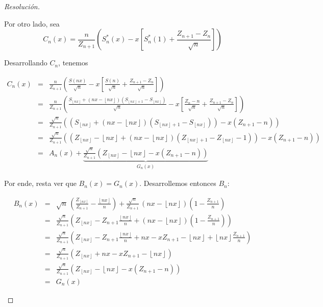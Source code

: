 \documentclass[a4paper,11pt]{article}
\newcommand{\Sst}[1]{S_n^{*}(#1)}
\newcommand{\floor}[1]{\left\lfloor #1 \right\rfloor}
\newcommand{\fnx}{\floor{nx}}
\begin{document}
\begin{proof}[Resoluci\'on]
\begin{enumerate}
    Por otro lado, sea
    $$C_n(x) = \frac{n}{Z_{n+1}} \left(\Sst{x} - x \left[ \Sst{1} + \frac{Z_{n+1} - Z_n}{\sqrt{n}} \right] \right)$$

    Desarrollando $C_n$, tenemos

    \begin{eqnarray*}
        C_n(x) &=& \frac{n}{Z_{n+1}} \left(\frac{S(nx)}{\sqrt{n}} - x \left[ \frac{S(n)}{\sqrt{n}} + \frac{Z_{n+1} - Z_n}{\sqrt{n}} \right] \right) \\
            &=& \frac{n}{Z_{n+1}} \left(\frac{S_{\floor{nx}} + (nx - \floor{nx}) (S_{\floor{nx}+1} - S_{\floor{nx}})}{\sqrt{n}} - x \left[ \frac{Z_n - n}{\sqrt{n}} + \frac{Z_{n+1} - Z_n}{\sqrt{n}} \right] \right) \\
            &=& \frac{\sqrt{n}}{Z_{n+1}} \left( \left(S_{\floor{nx}} + (nx - \floor{nx}) (S_{\floor{nx}+1} - S_{\floor{nx}})\right) - x \left( Z_{n+1} - n \right) \right) \\
            &=& \frac{\sqrt{n}}{Z_{n+1}} \left( \left(Z_{\floor{nx}} - \floor{nx} + (nx - \floor{nx}) (Z_{\floor{nx}+1} - Z_{\floor{nx}} - 1)\right) - x \left( Z_{n+1} - n \right) \right) \\
            &=& A_n(x) + \underbrace{ \frac{\sqrt{n}}{Z_{n+1}} \left(Z_{\floor{nx}} - \floor{nx}  - x \left( Z_{n+1} - n \right)\right) }_{G_n(x)}
    \end{eqnarray*}

    Por ende, resta ver que $B_n(x) = G_n(x)$. Desarrollemos entonces $B_n$:

    \begin{eqnarray*}    
        B_n(x) &=& \sqrt{n} \, \left(\frac{Z_{\fnx}}{Z_{n+1}} − \frac{\fnx}{n} \right) + \frac{\sqrt{n}}{Z_{n+1}} \, (nx - \floor{nx}) \left(1 - \frac{Z_{n+1}}{n}\right) \\
            &=& \frac{\sqrt{n}}{Z_{n+1}} \left( Z_{\fnx} - Z_{n+1} \frac{\fnx}{n} + (nx - \floor{nx}) \left(1 - \frac{Z_{n+1}}{n}\right) \right) \\
            &=& \frac{\sqrt{n}}{Z_{n+1}} \left( Z_{\fnx} - Z_{n+1} \frac{\fnx}{n} + nx - x Z_{n+1} - \fnx + \fnx \frac{Z_{n+1}}{n} \right) \\
            &=& \frac{\sqrt{n}}{Z_{n+1}} \left( Z_{\fnx} + nx - x Z_{n+1} - \fnx \right) \\
            &=& \frac{\sqrt{n}}{Z_{n+1}} \left( Z_{\fnx} - \fnx - x  (Z_{n+1} - n) \right) \\
            &=& G_n(x)
    \end{eqnarray*}
\end{enumerate}
\end{proof}
\end{document}
